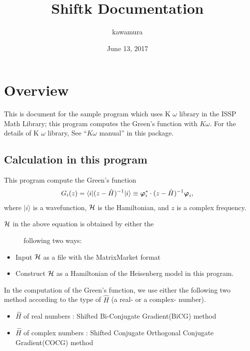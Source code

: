 \documentclass[letterpaper,10pt,dvipdfmx,openany]{sphinxmanual}
\title{Shiftk Documentation}
\date{June 13, 2017}
\author{kawamura}
\begin{document}
\maketitle
\tableofcontents
{}\label{index::doc}



\chapter{Overview}
\label{shiftk_overview_en:overview}\label{shiftk_overview_en:welcome-to-sample-program-s-documentation}\label{shiftk_overview_en::doc}
This is document for the sample program which uses
K \(\omega\) library in the ISSP Math Library;
this program computes the Green's function with \(K\omega\).
For the details of K \(\omega\) library, See
``\(K\omega\) manual'' in this package.


\section{Calculation in this program}
\label{shiftk_overview_en:calculation-in-this-program}
This program compute the Green's function
\begin{gather}
\begin{split}\begin{align}
G_{i}(z) =
\langle i | (z-{\hat H})^{-1}| i \rangle
\equiv
{\boldsymbol \varphi}_i^{*} \cdot (z-{\hat H})^{-1} {\boldsymbol \varphi}_i,
\end{align}\end{split}\notag
\end{gather}
where \(| i \rangle\) is a wavefunction,
\({\cal H}\) is the Hamiltonian, and
\(z\) is a complex frequency.
\begin{description}
\item[{\({\cal H}\) in the above equation is obtained by either the}] \leavevmode
following two ways:

\end{description}
\begin{itemize}
\item {} 
Input \({\cal H}\) as a file with the MatrixMarket format

\item {} 
Construct \({\cal H}\) as a Hamiltonian of the
Heisenberg model in this program.

\end{itemize}

In the computation of the Green's function,
we use either the following two method according to the type
of \({\hat H}\) (a real- or a complex- number).
\begin{itemize}
\item {} 
\({\hat H}\) of real numbers : Shifted Bi-Conjugate Gradient(BiCG) method

\item {} 
\({\hat H}\) of complex numbers : Shifted Conjugate Orthogonal Conjugate Gradient(COCG) method

\end{itemize}
\end{document}
